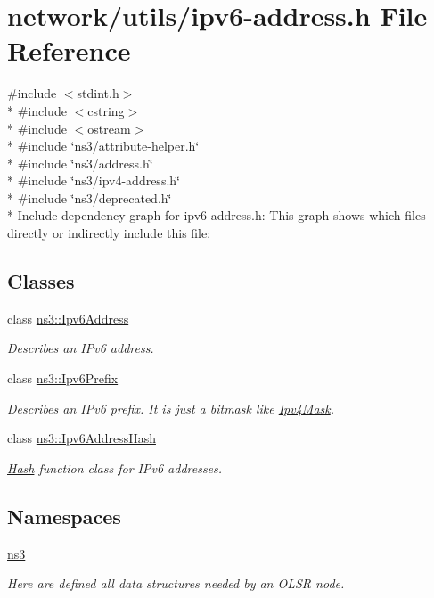 \hypertarget{ipv6-address_8h}{}\section{network/utils/ipv6-\/address.h File Reference}
\label{ipv6-address_8h}
{\ttfamily \#include $<$stdint.\+h$>$}\\*
{\ttfamily \#include $<$cstring$>$}\\*
{\ttfamily \#include $<$ostream$>$}\\*
{\ttfamily \#include \char`\"{}ns3/attribute-\/helper.\+h\char`\"{}}\\*
{\ttfamily \#include \char`\"{}ns3/address.\+h\char`\"{}}\\*
{\ttfamily \#include \char`\"{}ns3/ipv4-\/address.\+h\char`\"{}}\\*
{\ttfamily \#include \char`\"{}ns3/deprecated.\+h\char`\"{}}\\*
Include dependency graph for ipv6-\/address.h\+:
This graph shows which files directly or indirectly include this file\+:
\subsection*{Classes}
\begin{DoxyCompactItemize}
\item 
class \hyperlink{classns3_1_1Ipv6Address}{ns3\+::\+Ipv6\+Address}
\begin{DoxyCompactList}\small\item\em Describes an I\+Pv6 address. \end{DoxyCompactList}\item 
class \hyperlink{classns3_1_1Ipv6Prefix}{ns3\+::\+Ipv6\+Prefix}
\begin{DoxyCompactList}\small\item\em Describes an I\+Pv6 prefix. It is just a bitmask like \hyperlink{classns3_1_1Ipv4Mask}{Ipv4\+Mask}. \end{DoxyCompactList}\item 
class \hyperlink{classns3_1_1Ipv6AddressHash}{ns3\+::\+Ipv6\+Address\+Hash}
\begin{DoxyCompactList}\small\item\em \hyperlink{namespacens3_1_1Hash}{Hash} function class for I\+Pv6 addresses. \end{DoxyCompactList}\end{DoxyCompactItemize}
\subsection*{Namespaces}
\begin{DoxyCompactItemize}
\item 
 \hyperlink{namespacens3}{ns3}
\begin{DoxyCompactList}\small\item\em Here are defined all data structures needed by an O\+L\+SR node. \end{DoxyCompactList}\end{DoxyCompactItemize}
